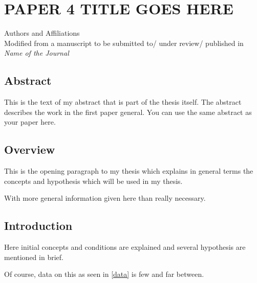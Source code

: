 \chapter{PAPER 4 TITLE GOES HERE}

\begin{center}
    Authors and Affiliations \\
    Modified from a manuscript to be submitted to/ under review/ published in \textit{Name of the Journal}
\end{center}

\section{Abstract}
This is the text of my abstract that is part of the thesis itself.
The abstract describes the work in the first paper general. You can use the same abstract as your paper here.


\section{Overview}

This is the opening paragraph to my thesis which
explains in general terms the concepts and hypothesis
which will be used in my thesis.

With more general information given here than really
necessary.

\section{Introduction}

Here initial concepts and conditions are explained and
several hypothesis are mentioned in brief.

Of course, data on this as seen in \autoref{data}
is few and far between.

